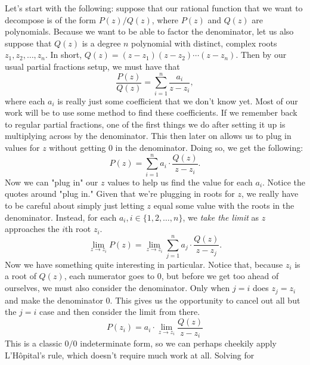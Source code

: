 Let's start with the following: suppose that our rational function that we want
to decompose is of the form \( P \left( z \right) / Q \left( z \right) \),
where \( P \left( z \right) \) and \( Q \left( z \right) \) are polynomials.
Because we want to be able to factor the denominator, let us also suppose that \( Q \left( z \right) \) is a degree \( n \) polynomial with distinct, complex roots \( z_1, z_2, \ldots, z_n \).  In short, \( Q \left( z \right) = \left( z - z_1 \right) \left( z - z_2 \right) \cdots \left( z - z_n \right) \). Then by our usual partial fractions setup, we must have that
\[
    \frac{P \left( z \right)}{Q \left( z \right)} = \sum_{i = 1}^{n} \frac{a_i}{z - z_i}
,\]
where each \( a_i \) is really just some coefficient that we don't know yet.
Most of our work will be to use some method to find these coefficients. If we
remember back to regular partial fractions, one of the first things we do after
setting it up is multiplying across by the denominator. This then later on
allows us to plug in values for \( z \) without getting \( 0 \) in the
denominator. Doing so, we get the following:
\[
    P \left( z \right) = \sum_{i = 1}^{n} a_i \cdot \frac{Q \left( z \right)}{z -  z_i}
.\]
Now we can "plug in" our \( z \) values to help us find the value for each \( a_i \). Notice the quotes around "plug in." Given that we're plugging in roots for \( z \), we really have to be careful about simply just letting \( z \) equal some value with the roots in the denominator. Instead, for each \( a_i, i \in \{ 1, 2, \ldots, n \} \), we \textit{take the limit} as \( z \) approaches the \( i \)th root \( z_i \).
\[
    \lim_{z \to z_i} P \left( z \right) = \lim_{z \to z_i} \sum_{j = 1}^{n} a_j \cdot \frac{Q \left( z \right)}{z - z_j}
.\]
Now we have something quite interesting in particular. Notice that, because \( z_i \) is a root of \( Q \left( z \right) \), each numerator goes to \( 0 \), but before we get too ahead of ourselves, we must also consider the denominator. Only when \( j = i \) does \( z_j = z_i \) and make the denominator \( 0 \). This gives us the opportunity to cancel out all but the \( j = i \) case and then consider the limit from there.
\[
    P \left( z_i \right) = a_i \cdot \lim_{z \to z_i} \frac{Q \left( z \right)}{z - z_i}
\]
This is a classic \( 0 / 0 \) indeterminate form, so we can perhaps cheekily
apply L'Hôpital's rule, which doesn't require much work at all. Solving for
